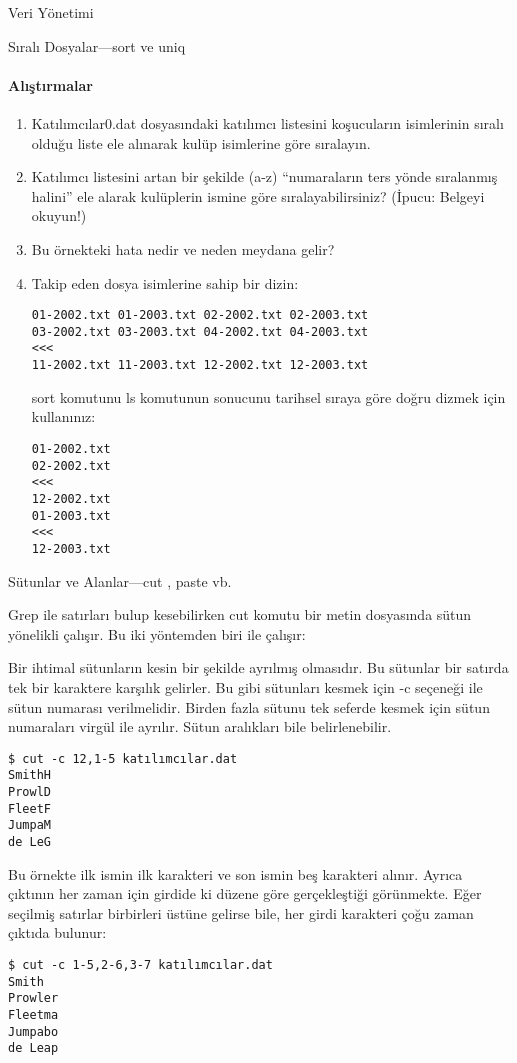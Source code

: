 \begin{section}{Veri Yönetimi}
\begin{subsection}{Sıralı Dosyalar—sort ve uniq}
\paragraph{{\Huge{\PencilLeftDown}}Alıştırmalar}{
\begin{enumerate}
 \item Katılımcılar0.dat dosyasındaki katılımcı listesini koşucuların isimlerinin sıralı olduğu liste ele alınarak kulüp isimlerine göre sıralayın.
 \item Katılımcı listesini artan bir şekilde (a-z) “numaraların ters yönde sıralanmış halini” ele alarak kulüplerin ismine göre sıralayabilirsiniz? (İpucu: Belgeyi okuyun!)
 \item Bu örnekteki hata nedir ve neden meydana gelir?
 \item Takip eden dosya isimlerine sahip bir dizin:
 \footnotesize
 \begin{verbatim}
01-2002.txt 01-2003.txt 02-2002.txt 02-2003.txt
03-2002.txt 03-2003.txt 04-2002.txt 04-2003.txt
<<<
11-2002.txt 11-2003.txt 12-2002.txt 12-2003.txt
 \end{verbatim}
 \normalsize
 sort komutunu ls komutunun sonucunu tarihsel sıraya göre doğru dizmek için kullanınız:
 \footnotesize
 \begin{verbatim}
01-2002.txt
02-2002.txt
<<<
12-2002.txt
01-2003.txt
<<<
12-2003.txt
 \end{verbatim}
 \normalsize
\end{enumerate}}
\end{subsection}
\begin{subsection}{Sütunlar ve Alanlar—cut , paste vb.}

Grep ile satırları bulup kesebilirken cut komutu bir metin dosyasında sütun yönelikli çalışır. Bu iki yöntemden biri ile çalışır:

Bir ihtimal sütunların kesin bir şekilde ayrılmış olmasıdır. Bu sütunlar bir satırda tek bir karaktere karşılık gelirler. Bu gibi sütunları kesmek için -c seçeneği ile sütun numarası verilmelidir. Birden fazla sütunu tek seferde kesmek için sütun numaraları virgül ile ayrılır. Sütun aralıkları bile belirlenebilir.
\footnotesize
\begin{verbatim}
$ cut -c 12,1-5 katılımcılar.dat 
SmithH 
ProwlD 
FleetF 
JumpaM 
de LeG 
\end{verbatim}
\normalsize

Bu örnekte ilk ismin ilk karakteri ve son ismin beş karakteri alınır. Ayrıca çıktının her zaman için girdide ki düzene göre gerçekleştiği görünmekte. Eğer seçilmiş satırlar birbirleri üstüne gelirse bile, her girdi karakteri çoğu zaman çıktıda bulunur:
\footnotesize
\begin{verbatim}
$ cut -c 1-5,2-6,3-7 katılımcılar.dat 
Smith 
Prowler 
Fleetma 
Jumpabo 
de Leap
\end{verbatim}
\normalsize


\end{subsection}
\end{section}
